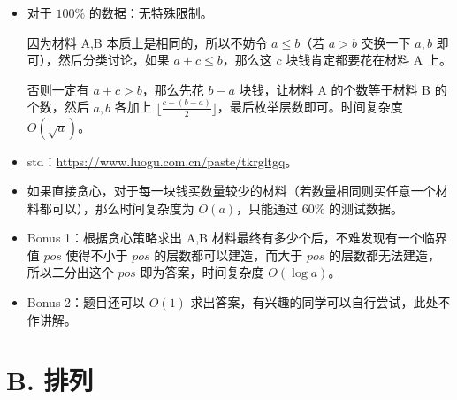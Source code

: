 \documentclass[10pt,aspectratio=43,mathserif]{beamer}
\begin{document}
\begin{frame}

	\begin{itemize} \setlength{\parskip}{0.4\baselineskip}

		\item 对于 $100\%$ 的数据：无特殊限制。

		因为材料 A,B 本质上是相同的，所以不妨令 $a\leq b$（若 $a>b$ 交换一下 $a,b$ 即可），然后分类讨论，如果 $a+c\leq b$，那么这 $c$ 块钱肯定都要花在材料 A 上。

		否则一定有 $a+c>b$，那么先花 $b-a$ 块钱，让材料 A 的个数等于材料 B 的个数，然后 $a,b$ 各加上 $\lfloor\frac{c-(b-a)}{2}\rfloor$，最后枚举层数即可。时间复杂度 $O(\sqrt{a})$。

		\item std：\url{https://www.luogu.com.cn/paste/tkrgltgq}。

		\item 如果直接贪心，对于每一块钱买数量较少的材料（若数量相同则买任意一个材料都可以），那么时间复杂度为 $O(a)$，只能通过 $60\%$ 的测试数据。

	\end{itemize}

\end{frame}

\begin{frame}

	\begin{itemize} \setlength{\parskip}{0.4\baselineskip}

		\item Bonus 1：根据贪心策略求出 A,B 材料最终有多少个后，不难发现有一个临界值 $pos$ 使得不小于 $pos$ 的层数都可以建造，而大于 $pos$ 的层数都无法建造，所以二分出这个 $pos$ 即为答案，时间复杂度 $O(\log a)$。

		\item Bonus 2：题目还可以 $O(1)$ 求出答案，有兴趣的同学可以自行尝试，此处不作讲解。

	\end{itemize}

\end{frame}


\section{B. 排列}
\end{document}
